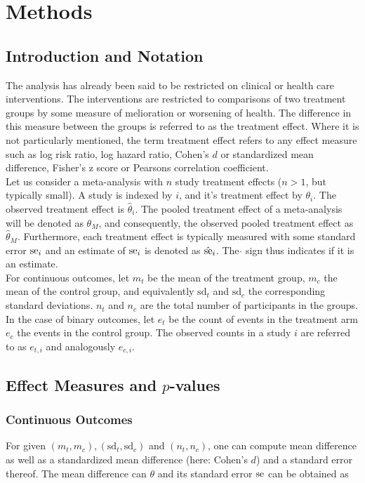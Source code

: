 \documentclass[11pt,a4paper,twoside]{book}\usepackage[]{graphicx}\usepackage[]{color}
\begin{document}




\chapter{Methods} \label{ch:methods}
\section{Introduction and Notation}
The analysis has already been said to be restricted on clinical or health care interventions. The interventions are restricted to comparisons of two treatment groups by some measure of melioration or worsening of health. The difference in this measure between the groups is referred to as the treatment effect. Where it is not particularly mentioned, the term treatment effect refers to any effect measure such as log risk ratio, log hazard ratio, Cohen's $d$ or standardized mean difference, Fisher's z score or Pearsons correlation coefficient.\\
Let us consider a meta-analysis with $n$ study treatment effects ($n > 1$, but typically small). A study is indexed by $i$, and it's treatment effect by  $\theta_i$. The observed treatment effect is $\hat{\theta}_i$. The pooled treatment effect of a meta-analysis will be denoted as $\theta_M$, and consequently, the observed pooled treatment effect as $\hat{\theta}_M$. Furthermore, each treatment effect is typically measured with some standard error $\operatorname{se}_i$ and an estimate of $\operatorname{se}_i$ is denoted as $\hat{\operatorname{se}}_i$. The $\hat{}$ sign thus indicates if it is an estimate.\\
For continuous outcomes, let $m_t$ be the mean of the treatment group, $m_c$ the mean of the control group, and equivalently $\textrm{sd}_t$ and $\textrm{sd}_c$ the corresponding standard deviations. $n_t$ and $n_c$ are the total number of participants in the groups.
In the case of binary outcomes, let $e_t$ be the count of events in the treatment arm $e_c$ the events in the control group. The observed counts in a study $i$ are referred to as $e_{t,i}$ and analogously $e_{c,i}$.

\section{Effect Measures and $p$-values}
\subsection{Continuous Outcomes}
For given $(m_t, m_c), (\textrm{sd}_t, \textrm{sd}_c)$ and $(n_t, n_c)$, one can compute mean difference as well as a standardized mean difference (here: Cohen's $d$) and a standard error thereof.
The mean difference can $\theta$ and its standard error $\operatorname{se}$ can be obtained as
\end{document}
